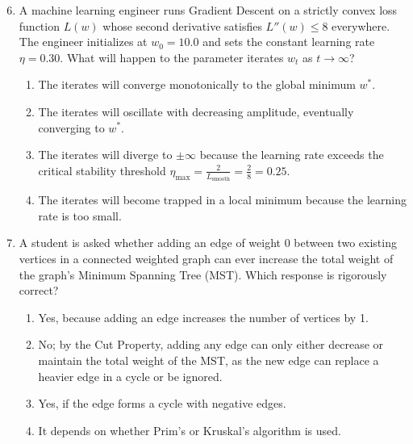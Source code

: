 \begin{enumerate}
    \setcounter{enumi}{5}
    \item A machine learning engineer runs Gradient Descent on a strictly convex loss function $L(w)$ whose second derivative satisfies $L''(w) \le 8$ everywhere. The engineer initializes at $w_0 = 10.0$ and sets the constant learning rate $\eta = 0.30$. What will happen to the parameter iterates $w_t$ as $t \to \infty$?
    \begin{enumerate}
        \item The iterates will converge monotonically to the global minimum $w^*$.
        \item The iterates will oscillate with decreasing amplitude, eventually converging to $w^*$.
        \item The iterates will diverge to $\pm \infty$ because the learning rate exceeds the critical stability threshold $\eta_{\text{max}} = \frac{2}{L_{\text{smooth}}} = \frac{2}{8} = 0.25$.
        \item The iterates will become trapped in a local minimum because the learning rate is too small.
    \end{enumerate}

    \item A student is asked whether adding an edge of weight 0 between two existing vertices in a connected weighted graph can ever increase the total weight of the graph's Minimum Spanning Tree (MST). Which response is rigorously correct?
    \begin{enumerate}
        \item Yes, because adding an edge increases the number of vertices by 1.
        \item No; by the Cut Property, adding any edge can only either decrease or maintain the total weight of the MST, as the new edge can replace a heavier edge in a cycle or be ignored.
        \item Yes, if the edge forms a cycle with negative edges.
        \item It depends on whether Prim's or Kruskal's algorithm is used.
    \end{enumerate}
\end{enumerate}
